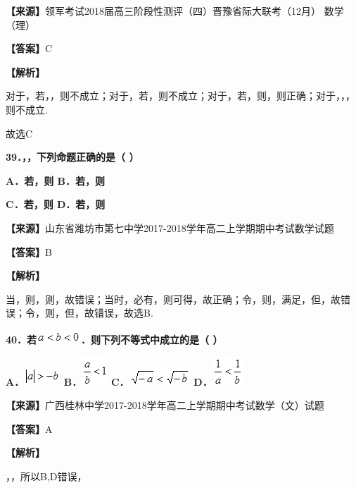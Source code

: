 \documentclass[
]{article}
\begin{document}
\textbf{【来源】}领军考试2018届高三阶段性测评（四）晋豫省际大联考（12月）
数学（理）

\textbf{【答案】}C

\textbf{【解析】}

对于，若，，则不成立；对于，若，则不成立；对于，若，则，则正确；对于，，，则不成立.

故选C

\textbf{39．，，下列命题正确的是（ ）}

\textbf{A．若，则 B．若，则}

\textbf{C．若，则 D．若，则}

\textbf{【来源】}山东省潍坊市第七中学2017-2018学年高二上学期期中考试数学试题

\textbf{【答案】}B

\textbf{【解析】}

当，则，则，故错误；当时，必有，则可得，故正确；令，则，满足，但，故错误；令，则，但，故错误，故选B.

\textbf{40．若}\includegraphics[width=0.65634in,height=0.19794in]{Fig//media/image417.png}\textbf{．则下列不等式中成立的是（
）}

\textbf{A．}\includegraphics[width=0.54174in,height=0.28129in]{Fig//media/image418.png}
\textbf{B．}\includegraphics[width=0.38547in,height=0.42714in]{Fig//media/image419.png}
\textbf{C．}\includegraphics[width=0.90638in,height=0.25003in]{Fig//media/image420.png}
\textbf{D．}\includegraphics[width=0.44798in,height=0.42714in]{Fig//media/image421.png}

\textbf{【来源】}广西桂林中学2017-2018学年高二上学期期中考试数学（文）试题

\textbf{【答案】}A

\textbf{【解析】}

，，所以B,D错误，
\end{document}
